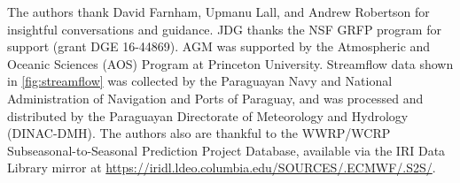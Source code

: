 \documentclass{ametsoc}
\begin{document}

\acknowledgments
The authors thank David Farnham, Upmanu Lall, and Andrew Robertson for insightful conversations and guidance.
JDG thanks the NSF GRFP program for support (grant DGE 16-44869).
AGM was supported by the Atmospheric and Oceanic Sciences (AOS) Program at Princeton University.
Streamflow data shown in \cref{fig:streamflow} was collected by the Paraguayan Navy and National Administration of Navigation and Ports of Paraguay, and was processed and distributed by the Paraguayan Directorate of Meteorology and Hydrology (DINAC-DMH).
The authors also are thankful to the WWRP/WCRP Subseasonal-to-Seasonal Prediction Project Database, available via the IRI Data Library mirror at \url{https://iridl.ldeo.columbia.edu/SOURCES/.ECMWF/.S2S/}.




\end{document}
